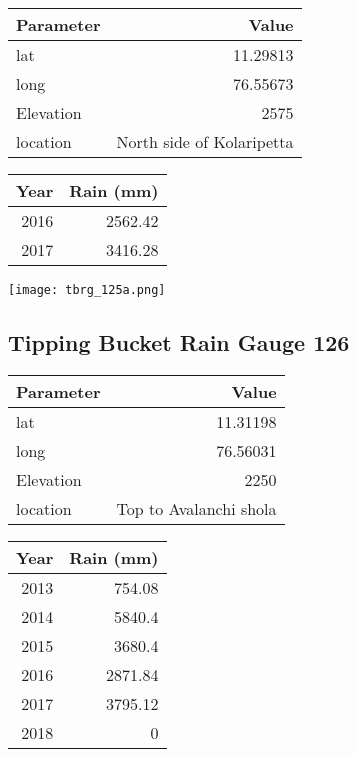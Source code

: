 \documentclass[a4paper]{article}
\begin{document}
\begin{center}
\begin{tabular}{lr}
Parameter & Value\\
\hline
lat & 11.29813\\
long & 76.55673\\
Elevation & 2575\\
location & North side of Kolaripetta\\
\end{tabular}
\end{center}

\begin{center}
\begin{tabular}{rr}
Year & Rain (mm)\\
\hline
2016 & 2562.42\\
2017 & 3416.28\\
\end{tabular}
\end{center}

\begin{center}
\texttt{[image: tbrg\_125a.png]}
\end{center}

\newpage

\subsection*{Tipping Bucket Rain Gauge 126}
\label{sec:org5dac872}

\begin{center}
\begin{tabular}{lr}
Parameter & Value\\
\hline
lat & 11.31198\\
long & 76.56031\\
Elevation & 2250\\
location & Top to Avalanchi shola\\
\end{tabular}
\end{center}

\begin{center}
\begin{tabular}{rr}
Year & Rain (mm)\\
\hline
2013 & 754.08\\
2014 & 5840.4\\
2015 & 3680.4\\
2016 & 2871.84\\
2017 & 3795.12\\
2018 & 0\\
\end{tabular}
\end{center}
\end{document}
